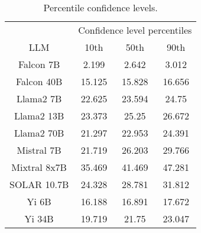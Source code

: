 \begin{table*}
\centering
\begin{tabular}{c|c|c|c}
& \multicolumn{3}{c}{Confidence level percentiles} \\ 
LLM & 10th & 50th & 90th\\ \hline
Falcon 7B & 2.199 & 2.642 & 3.012\\
Falcon 40B & 15.125 & 15.828 & 16.656\\
Llama2 7B & 22.625 & 23.594 & 24.75\\
Llama2 13B & 23.373 & 25.25 & 26.672\\
Llama2 70B & 21.297 & 22.953 & 24.391\\
Mistral 7B & 21.719 & 26.203 & 29.766\\
Mixtral 8x7B & 35.469 & 41.469 & 47.281\\
SOLAR 10.7B & 24.328 & 28.781 & 31.812\\
Yi 6B & 16.188 & 16.891 & 17.672\\
Yi 34B & 19.719 & 21.75 & 23.047\\
\hline
\end{tabular}
\caption{Percentile confidence levels.}
\label{tab:percentile_conf}
\end{table*}
